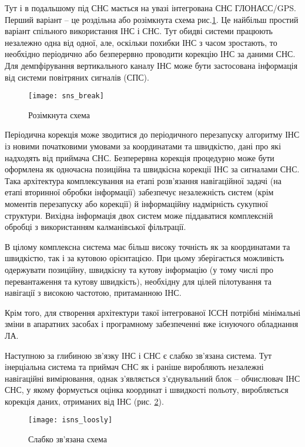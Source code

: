 Тут і в подальшому під СНС мається на увазі інтегрована СНС ГЛОНАСС/GPS. 
Перший варіант -- це роздільна або розімкнута схема рис.\ref{fig:isns_break}.  Це  найбільш 
простий варіант спільного використання ІНС і СНС. Тут обидві системи працюють незалежно 
одна від одної, але, оскільки похибки ІНС з часом зростають, то необхідно періодично
або безперервно проводити корекцію ІНС за даними СНС. Для демпфірування вертикального 
каналу ІНС може бути застосована інформація від системи повітряних сигналів (СПС).
\begin{figure}[here]
\centering
\texttt{[image: sns\_break]}
\caption{Розімкнута схема}
\label{fig:isns_break}
\end{figure}

Періодична корекція може зводитися до періодичного перезапуску алгоритму ІНС із новими 
початковими умовами за координатами та швидкістю, дані про які надходять від приймача СНС. 
Безперервна корекція процедурно може бути оформлена як одночасна позиційна та 
швидкісна корекції ІНС за сигналами СНС. Така архітектура комплексування на  
етапі розв'язання навігаційної задачі (на етапі вторинної обробки інформації) 
забезпечує незалежність систем (крім моментів  перезапуску або корекції) й 
інформаційну надмірність сукупної структури. Вихідна інформація двох систем може 
піддаватися комплексній обробці з використанням калманівської фільтрації.

В цілому комплексна система має більш високу точність як за координатами та швидкістю, 
так і за кутовою орієнтацією. При цьому зберігається можливість одержувати позиційну, 
швидкісну та кутову інформацію (у тому числі про перевантаження та кутову швидкість), 
необхідну для цілей пілотування та навігації з високою частотою, притаманною ІНС.

Крім того, для створення  архітектури такої інтегрованої ІССН потрібні мінімальні зміни 
в апаратних засобах і програмному забезпеченні вже існуючого обладнання ЛА.

Наступною за глибиною зв'язку ІНС і СНС є слабко зв'язана система. Тут інерціальна 
система та приймач СНС як і раніше виробляють незалежні навігаційні вимірювання, 
однак з'являється з'єднувальний блок -- обчислювач ІНС СНС, у якому формується оцінка 
координат і швидкості польоту, виробляється корекція даних, отриманих від ІНС (рис. 
\ref{fig:isns_loosly}).

\begin{figure}[here]
\centering
\texttt{[image: isns\_loosly]}
\caption{Слабко зв’язана схема}
\label{fig:isns_loosly}
\end{figure}

